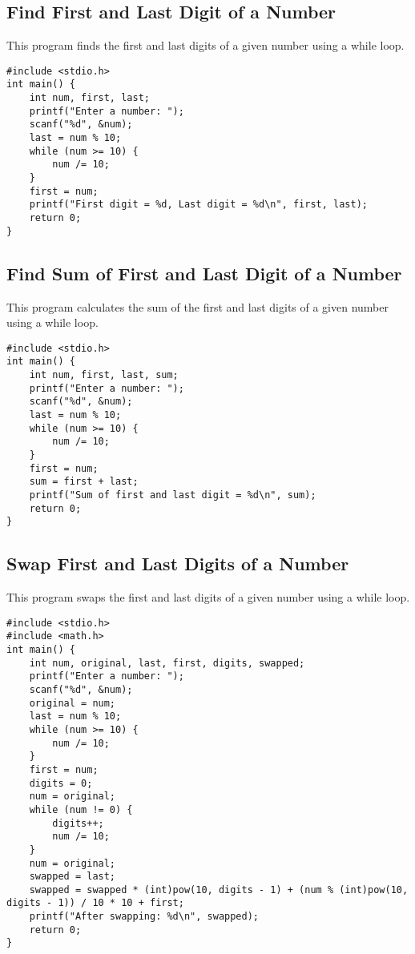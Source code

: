 \documentclass[a4paper,12pt]{article}
\begin{document}
\subsection{Find First and Last Digit of a Number}
This program finds the first and last digits of a given number using a while loop.

\begin{lstlisting}[caption={Find First and Last Digit of a Number}]
#include <stdio.h>
int main() {
    int num, first, last;
    printf("Enter a number: ");
    scanf("%d", &num);
    last = num % 10;
    while (num >= 10) {
        num /= 10;
    }
    first = num;
    printf("First digit = %d, Last digit = %d\n", first, last);
    return 0;
}
\end{lstlisting}

\newpage

\subsection{Find Sum of First and Last Digit of a Number}
This program calculates the sum of the first and last digits of a given number using a while loop.

\begin{lstlisting}[caption={Find Sum of First and Last Digit of a Number}]
#include <stdio.h>
int main() {
    int num, first, last, sum;
    printf("Enter a number: ");
    scanf("%d", &num);
    last = num % 10;
    while (num >= 10) {
        num /= 10;
    }
    first = num;
    sum = first + last;
    printf("Sum of first and last digit = %d\n", sum);
    return 0;
}
\end{lstlisting}

\newpage

\subsection{Swap First and Last Digits of a Number}
This program swaps the first and last digits of a given number using a while loop.

\begin{lstlisting}[caption={Swap First and Last Digits of a Number}]
#include <stdio.h>
#include <math.h>
int main() {
    int num, original, last, first, digits, swapped;
    printf("Enter a number: ");
    scanf("%d", &num);
    original = num;
    last = num % 10;
    while (num >= 10) {
        num /= 10;
    }
    first = num;
    digits = 0;
    num = original;
    while (num != 0) {
        digits++;
        num /= 10;
    }
    num = original;
    swapped = last;
    swapped = swapped * (int)pow(10, digits - 1) + (num % (int)pow(10, digits - 1)) / 10 * 10 + first;
    printf("After swapping: %d\n", swapped);
    return 0;
}
\end{lstlisting}
\end{document}
